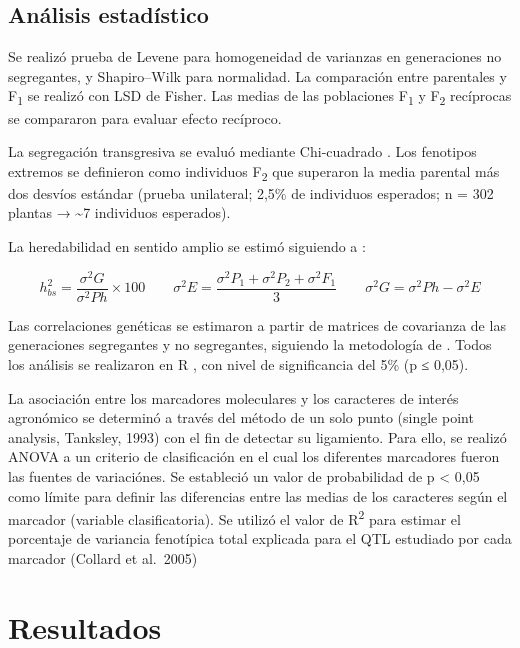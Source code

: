 \documentclass[12pt,oneside]{reedthesis}
\begin{document}
\subsection{Análisis estadístico}\label{anuxe1lisis-estaduxedstico-1}

Se realizó prueba de Levene para homogeneidad de varianzas en generaciones no segregantes, y Shapiro--Wilk para normalidad. La comparación entre parentales y F\textsubscript{1} se realizó con LSD de Fisher. Las medias de las poblaciones F\textsubscript{1} y F\textsubscript{2} recíprocas se compararon para evaluar efecto recíproco.

La segregación transgresiva se evaluó mediante Chi-cuadrado \autocite{rodriguez2005}. Los fenotipos extremos se definieron como individuos F\textsubscript{2} que superaron la media parental más dos desvíos estándar (prueba unilateral; 2,5\% de individuos esperados; n = 302 plantas → \textasciitilde7 individuos esperados).

La heredabilidad en sentido amplio se estimó siguiendo a \textcite{kearsey1996}:

\[h_{bs}^{2}=\frac{\sigma^{2}G}{\sigma^{2}Ph}\times100 \qquad \sigma^{2}E = \frac{\sigma^{2}P_1 + \sigma^{2}P_2 + \sigma^{2}F_1}{3} \qquad \sigma^{2}G = \sigma^{2}Ph - \sigma^{2}E\]

Las correlaciones genéticas se estimaron a partir de matrices de covarianza de las generaciones segregantes y no segregantes, siguiendo la metodología de \textcite{kearsey1996}. Todos los análisis se realizaron en R \autocite{R2024}, con nivel de significancia del 5\% (p ≤ 0,05).

La asociación entre los marcadores moleculares y los caracteres de interés agronómico se determinó a través del método de un solo punto (single point analysis, Tanksley, 1993) con el fin de detectar su ligamiento. Para ello, se realizó ANOVA a un criterio de clasificación en el cual los diferentes marcadores fueron las fuentes de variaciónes. Se estableció un valor de probabilidad de p \textless{} 0,05 como límite para definir las diferencias entre las medias de los caracteres según el marcador (variable clasificatoria). Se utilizó el valor de R\textsuperscript{2} para estimar el porcentaje de variancia fenotípica total explicada para el QTL estudiado por cada marcador (Collard et al.~2005)\\

\section{Resultados}\label{resultados-1}
\end{document}
